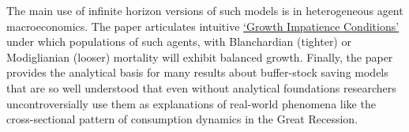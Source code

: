 \documentclass[BufferStockTheory]{subfiles}
\begin{document}
The main use of infinite horizon versions of such models is in heterogeneous agent macroeconomics. The paper articulates intuitive \href{https://econ-ark.github.io/BufferStockTheory#GICAgg}{`Growth Impatience Conditions'} under which populations of such agents, with Blanchardian (tighter) or Modiglianian (looser) mortality will exhibit balanced growth.  Finally, the paper provides the analytical basis for many results about buffer-stock saving models that are so well understood that even without analytical foundations researchers uncontroversially use them as explanations of real-world phenomena like the cross-sectional pattern of consumption dynamics in the Great Recession.




\onlyinsubfile{}
\end{document}
